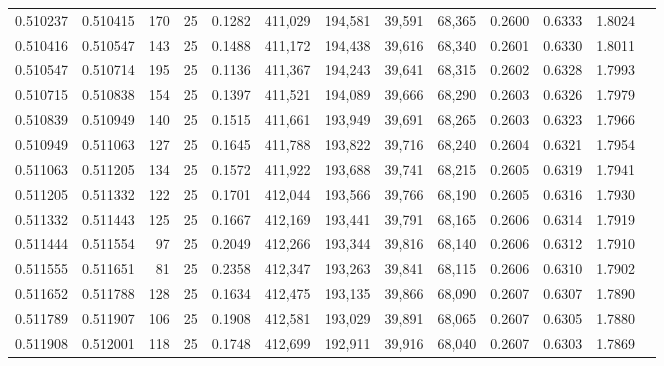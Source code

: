 \begin{tabular}{rrrrrrrrrrrrr}
0.510237 & 0.510415 &   170 &  25 &                                     0.1282 & 411,029 & 194,581 &  39,591 &  68,365 & 0.2600 & 0.6333 & 1.8024 \\
0.510416 & 0.510547 &   143 &  25 &                                     0.1488 & 411,172 & 194,438 &  39,616 &  68,340 & 0.2601 & 0.6330 & 1.8011 \\
0.510547 & 0.510714 &   195 &  25 &                                     0.1136 & 411,367 & 194,243 &  39,641 &  68,315 & 0.2602 & 0.6328 & 1.7993 \\
0.510715 & 0.510838 &   154 &  25 &                                     0.1397 & 411,521 & 194,089 &  39,666 &  68,290 & 0.2603 & 0.6326 & 1.7979 \\
0.510839 & 0.510949 &   140 &  25 &                                     0.1515 & 411,661 & 193,949 &  39,691 &  68,265 & 0.2603 & 0.6323 & 1.7966 \\
0.510949 & 0.511063 &   127 &  25 &                                     0.1645 & 411,788 & 193,822 &  39,716 &  68,240 & 0.2604 & 0.6321 & 1.7954 \\
0.511063 & 0.511205 &   134 &  25 &                                     0.1572 & 411,922 & 193,688 &  39,741 &  68,215 & 0.2605 & 0.6319 & 1.7941 \\
0.511205 & 0.511332 &   122 &  25 &                                     0.1701 & 412,044 & 193,566 &  39,766 &  68,190 & 0.2605 & 0.6316 & 1.7930 \\
0.511332 & 0.511443 &   125 &  25 &                                     0.1667 & 412,169 & 193,441 &  39,791 &  68,165 & 0.2606 & 0.6314 & 1.7919 \\
0.511444 & 0.511554 &    97 &  25 &                                     0.2049 & 412,266 & 193,344 &  39,816 &  68,140 & 0.2606 & 0.6312 & 1.7910 \\
0.511555 & 0.511651 &    81 &  25 &                                     0.2358 & 412,347 & 193,263 &  39,841 &  68,115 & 0.2606 & 0.6310 & 1.7902 \\
0.511652 & 0.511788 &   128 &  25 &                                     0.1634 & 412,475 & 193,135 &  39,866 &  68,090 & 0.2607 & 0.6307 & 1.7890 \\
0.511789 & 0.511907 &   106 &  25 &                                     0.1908 & 412,581 & 193,029 &  39,891 &  68,065 & 0.2607 & 0.6305 & 1.7880 \\
0.511908 & 0.512001 &   118 &  25 &                                     0.1748 & 412,699 & 192,911 &  39,916 &  68,040 & 0.2607 & 0.6303 & 1.7869 \\

\end{tabular}
